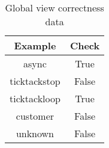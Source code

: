 \begin{table}[!ht]
\centering
\begin{tabular}{|c|c|}
\hline
Example & Check \\ 
\hline
async & True \\ 
ticktackstop & False \\ 
ticktackloop & True \\ 
customer & False \\ 
unknown & False \\ 
\hline
\end{tabular}
\caption{Global view correctness data}
\label{tab:gvbench}
\end{table}